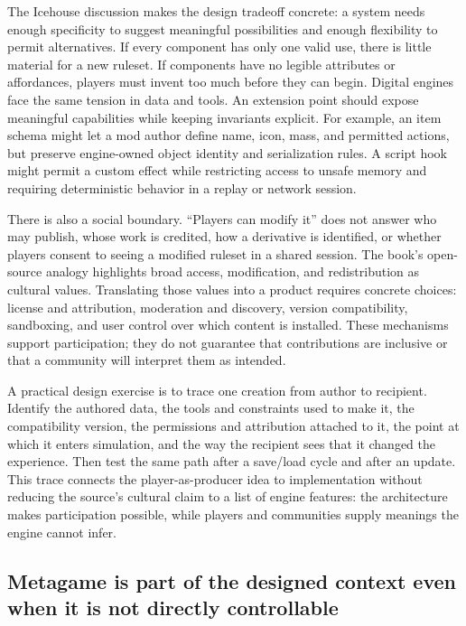 The Icehouse discussion makes the design tradeoff concrete: a system needs enough specificity to suggest meaningful possibilities and enough flexibility to permit alternatives. If every component has only one valid use, there is little material for a new ruleset. If components have no legible attributes or affordances, players must invent too much before they can begin. Digital engines face the same tension in data and tools. An extension point should expose meaningful capabilities while keeping invariants explicit. For example, an item schema might let a mod author define name, icon, mass, and permitted actions, but preserve engine-owned object identity and serialization rules. A script hook might permit a custom effect while restricting access to unsafe memory and requiring deterministic behavior in a replay or network session.

There is also a social boundary. ``Players can modify it'' does not answer who may publish, whose work is credited, how a derivative is identified, or whether players consent to seeing a modified ruleset in a shared session. The book's open-source analogy highlights broad access, modification, and redistribution as cultural values. Translating those values into a product requires concrete choices: license and attribution, moderation and discovery, version compatibility, sandboxing, and user control over which content is installed. These mechanisms support participation; they do not guarantee that contributions are inclusive or that a community will interpret them as intended.

A practical design exercise is to trace one creation from author to recipient. Identify the authored data, the tools and constraints used to make it, the compatibility version, the permissions and attribution attached to it, the point at which it enters simulation, and the way the recipient sees that it changed the experience. Then test the same path after a save/load cycle and after an update. This trace connects the player-as-producer idea to implementation without reducing the source's cultural claim to a list of engine features: the architecture makes participation possible, while players and communities supply meanings the engine cannot infer.

\subsection{Metagame is part of the designed context even when it is not directly controllable}\label{06-engine-ii-ch046-metagame-is-part-of-the-designed-context-even-when-it-is-not-directly-controllable}

